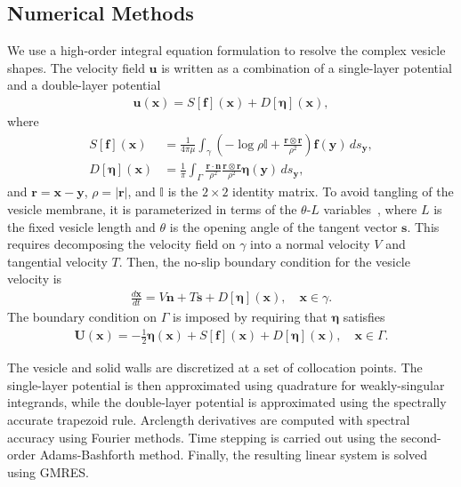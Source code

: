 \documentclass[twoside,twocolumn,9pt]{article}
\newcommand{\ff}{\mathbf{f}}
\newcommand{\eeta}{\boldsymbol{\eta}}
\newcommand{\nn}{\mathbf{n}}
\newcommand{\rr}{\mathbf{r}}
\renewcommand{\ss}{\mathbf{s}}
\newcommand{\uu}{\mathbf{u}}
\newcommand{\UU}{\mathbf{U}}
\newcommand{\xx}{\mathbf{x}}
\newcommand{\yy}{\mathbf{y}}
\begin{document}
\subsection{\label{sec:NumericalMethods}Numerical Methods}
We use a high-order integral equation formulation to resolve the complex
vesicle shapes. The velocity field $\uu$ is written as a combination of
a single-layer potential and a double-layer potential
\begin{align}
  \label{eqn:LPrep}
  \uu(\xx) = S[\ff](\xx) + D[\eeta](\xx),
\end{align}
where
\begin{align}
  S[\ff](\xx) &= \frac{1}{4\pi\mu} \int_{\gamma} \left(
    -\log \rho \mathds{I} + \frac{\rr \otimes \rr}{\rho^2} \right)
    \ff(\yy) \, ds_\yy, \\
%
    D[\eeta](\xx) &= \frac{1}{\pi} \int_{\Gamma} 
      \frac{\rr \cdot \nn}{\rho^2} 
      \frac{\rr \otimes \rr}{\rho^2} \eeta(\yy) \, ds_\yy,
\end{align}
and $\rr = \xx - \yy$, $\rho = |\rr|$, and $\mathds{I}$ is the $2 \times
2$ identity matrix. To avoid tangling of the vesicle membrane, it is
parameterized in terms of the $\theta$-$L$
variables~\cite{hou-low-she1994}, where $L$ is the fixed vesicle length
and $\theta$ is the opening angle of the tangent vector $\ss$. This
requires decomposing the velocity field on $\gamma$ into a normal
velocity $V$ and tangential velocity $T$. Then, the no-slip boundary
condition for the vesicle velocity is
\begin{align}
  \frac{d\xx}{dt} = V \nn + T \ss + D[\eeta](\xx), \quad \xx \in \gamma.
\end{align}
The boundary condition on $\Gamma$ is imposed by requiring that $\eeta$
satisfies
\begin{align}
  \UU(\xx) = -\frac{1}{2}\eeta(\xx) + 
    S[\ff](\xx) + D[\eeta](\xx), \quad \xx \in \Gamma.
  \label{eqn:DLP_BIE}
\end{align}

The vesicle and solid walls are discretized at a set of collocation
points. The single-layer potential is then approximated using quadrature
for weakly-singular integrands, while the double-layer potential is
approximated using the spectrally accurate trapezoid rule. Arclength
derivatives are computed with spectral accuracy using Fourier methods.
Time stepping is carried out using the second-order Adams-Bashforth
method. Finally, the resulting linear system is solved using GMRES.


\end{document}
